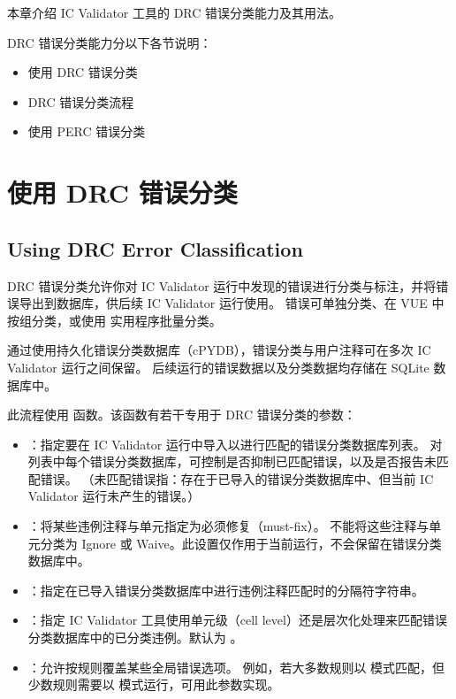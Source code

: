 \label{chap:drclass}

本章介绍 IC Validator 工具的 DRC 错误分类能力及其用法。

DRC 错误分类能力分以下各节说明：
\begin{itemize}
  \item 使用 DRC 错误分类
  \item DRC 错误分类流程
  \item 使用 PERC 错误分类
\end{itemize}

\section{使用 DRC 错误分类}
\subsection*{Using DRC Error Classification}

DRC 错误分类允许你对 IC Validator 运行中发现的错误进行分类与标注，并将错误导出到数据库，供后续 IC Validator 运行使用。
错误可单独分类、在 VUE 中按组分类，或使用  实用程序批量分类。

通过使用持久化错误分类数据库（cPYDB），错误分类与用户注释可在多次 IC Validator 运行之间保留。
后续运行的错误数据以及分类数据均存储在 SQLite 数据库中。

此流程使用  函数。该函数有若干专用于 DRC 错误分类的参数：
\begin{itemize}
  \item {}：指定要在 IC Validator 运行中导入以进行匹配的错误分类数据库列表。
    对列表中每个错误分类数据库，可控制是否抑制已匹配错误，以及是否报告未匹配错误。
    （未匹配错误指：存在于已导入的错误分类数据库中、但当前 IC Validator 运行未产生的错误。）
  \item {}：将某些违例注释与单元指定为必须修复（must-fix）。
    不能将这些注释与单元分类为 Ignore 或 Waive。此设置仅作用于当前运行，不会保留在错误分类数据库中。
  \item {}：指定在已导入错误分类数据库中进行违例注释匹配时的分隔符字符串。
  \item {}：指定 IC Validator 工具使用单元级（cell level）还是层次化处理来匹配错误分类数据库中的已分类违例。默认为 。
  \item {}：允许按规则覆盖某些全局错误选项。
    例如，若大多数规则以  模式匹配，但少数规则需要以  模式运行，可用此参数实现。
\end{itemize}

